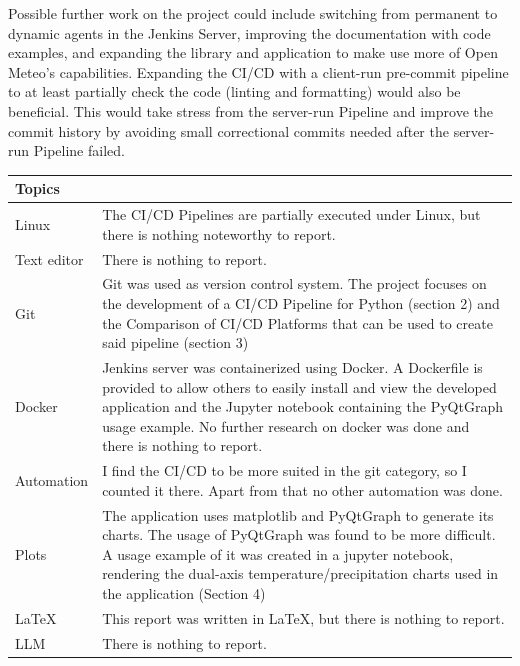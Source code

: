 \documentclass{llncs}
\begin{document}
Possible further work on the project could include switching from permanent to dynamic agents in the Jenkins Server, improving the documentation with code examples, and expanding the library and application to make use more of Open Meteo's capabilities. Expanding the CI/CD with a client-run pre-commit pipeline to at least partially check the code (linting and formatting) would also be beneficial. This would take stress from the server-run Pipeline and improve the commit history by avoiding small correctional commits needed after the server-run Pipeline failed.





\begin{tabular}{@{}p{3cm}|p{10cm}@{}}

\textbf{Topics}  \\
\hline
Linux & The CI/CD Pipelines are partially executed under Linux, but there is nothing noteworthy to report. \\
Text editor & There is nothing to report.\\
Git & Git was used as version control system. The project focuses on the development of a CI/CD Pipeline for Python (section 2) and the Comparison of CI/CD Platforms that can be used to create said pipeline (section 3) \\
Docker & Jenkins server was containerized using Docker. A Dockerfile is provided to allow others to easily install and view the developed application and the Jupyter notebook containing the PyQtGraph usage example. No further research on docker was done and there is nothing to report. \\
Automation & I find the CI/CD to be more suited in the git category, so I counted it there. Apart from that no other automation was done. \\
Plots & The application uses matplotlib and PyQtGraph to generate its charts. The usage of PyQtGraph was found to be more difficult. A usage example of it was created in a jupyter notebook, rendering the dual-axis temperature/precipitation charts used in the application (Section 4)\\
\LaTeX & This report was written in \LaTeX, but there is nothing to report. \\
LLM & There is nothing to report.
\end{tabular}


\appendix
\end{document}
